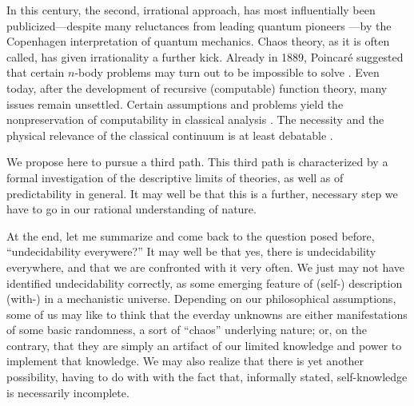 In this century,
the second, irrational approach, has
most influentially
been publicized---despite many reluctances from leading quantum pioneers
\cite{jammer,wheeler-Zurek:83}---by
the Copenhagen interpretation of quantum mechanics.
Chaos theory, as it is often called, has given irrationality a further
kick. Already in 1889, Poincar\'{e} suggested that certain
$n$-body problems may turn out to be impossible to solve
\cite{poincare}. Even today, after the development of recursive
(computable) function theory, many issues remain unsettled.
Certain assumptions and  problems yield the
nonpreservation of computability in classical analysis
\cite{specker,wang,kreisel,ds,pour-el,calude-sv}.
The necessity and the physical relevance of the classical continuum is
at least debatable \cite{svozil-set}.


We propose here to pursue a third path.
This third path
is characterized by
a formal investigation of the descriptive limits of theories,
as well as of predictability in general.
It may well be that this is a further, necessary step we have to go in
our rational understanding of nature.

At the end, let me summarize and come back to the question posed before,
``undecidability everywere?''  It may well be that yes, there is
undecidability everywhere, and that we are confronted with it very
often.  We just may not have identified undecidability correctly, as
some emerging feature of (self-) description (with-) in a mechanistic
universe.  Depending on our philosophical assumptions, some of us may
like to think that the everday unknowns are either manifestations of
some basic randomness, a sort of ``chaos'' underlying nature; or, on the
contrary, that they are simply an artifact of our limited knowledge and
power to implement that knowledge.  We may also realize that there is
yet another possibility, having to do with with the fact that,
informally stated, self-knowledge is necessarily incomplete.


